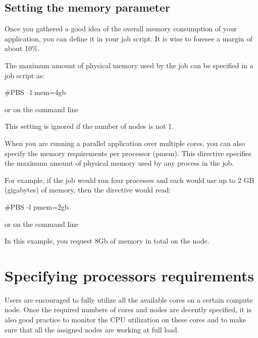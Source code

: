 \begin{prompt}
\end{prompt}

\subsection{Setting the memory parameter}

Once you gathered a good idea of the overall memory consumption of your
application, you can define it in your job script.  It is wise to foresee a
margin of about 10\%.


The maximum amount of physical memory used by the job can be specified in a job
script as:

\begin{prompt}
#PBS --l mem=4gb
\end{prompt}

or on the command line
\begin{prompt}
\end{prompt}

This setting is ignored if the number of nodes is not 1.


When you are running a parallel application over multiple cores, you can also
specify the memory requirements per processor (pmem). This directive specifies
the maximum amount of physical memory used by any process in the job.

For example, if the job would run four processes and each would use up to 2 GB
(gigabytes) of memory, then the directive would read:

\begin{prompt}
#PBS -l pmem=2gb
\end{prompt}

or on the command line
\begin{prompt}
\end{prompt}

In this example, you request 8Gb of memory in total on the node.

\section{Specifying processors requirements}

Users are encouraged to fully utilize all the available cores on a certain
compute node. Once the required numbers of cores and nodes are decently
specified, it is also good practice to monitor the CPU utilization on these
cores and to make sure that all the assigned nodes are working at full load.

